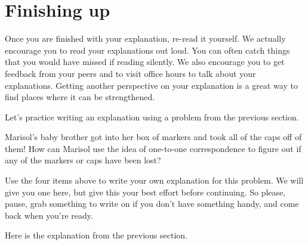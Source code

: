 \documentclass[noauthor,nooutcomes]{ximera}
\begin{document}
\section{Finishing up}
Once you are finished with your explanation, re-read it yourself. We actually encourage you to read your explanations out loud. You can often catch things that you would have missed if reading silently. We also encourage you to get feedback from your peers and to visit office hours to talk about your explanations. Getting another perspective on your explanation is a great way to find places where it can be strengthened.


Let's practice writing an explanation using a problem from the previous section.



\begin{problem}
Marisol's baby brother got into her box of markers and took all of the caps off of them! How can Marisol  use the idea of one-to-one correspondence to figure out if any of the markers or caps have been lost?

\begin{prompt} %
Use the four items above to write your own explanation for this problem. We will give you one here, but give this your best effort before continuing. So please, pause, grab something to write on if you don't have something handy, and come back when you're ready.

\begin{multipleChoice}
\end{multipleChoice}
\end{prompt}



\begin{problem} Here is the explanation from the previous section.



\end{problem}
\end{problem}
\end{document}
